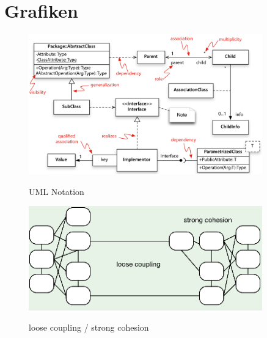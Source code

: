 {\let\clearpage\relax \chapter{Grafiken}}
\begin{figure}[htb]
	\centering
	\begin{minipage}[t]{0.45\textwidth}
		\centering
		\includegraphics[width=0.9\textwidth]{images/uml}
		\label{fig:uml_notation}
		\caption{UML Notation}
	\end{minipage}%
	\hfill
	\begin{minipage}[t]{0.45\textwidth}
		\centering
		\includegraphics[width=0.9\textwidth]{images/loose_coupling}
		\label{fig:loose_coupling}
		\caption{loose coupling / strong cohesion}
	\end{minipage}
\end{figure}

